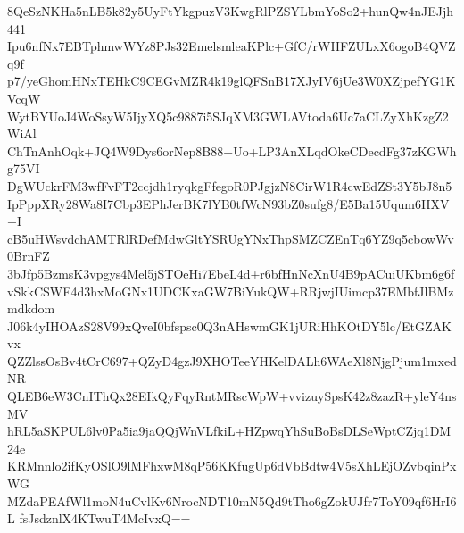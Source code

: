 8QeSzNKHa5nLB5k82y5UyFtYkgpuzV3KwgRlPZSYLbmYoSo2+hunQw4nJEJjh441
Ipu6nfNx7EBTphmwWYz8PJs32EmelsmleaKPlc+GfC/rWHFZULxX6ogoB4QVZq9f
p7/yeGhomHNxTEHkC9CEGvMZR4k19glQFSnB17XJyIV6jUe3W0XZjpefYG1KVcqW
WytBYUoJ4WoSsyW5IjyXQ5c9887i5SJqXM3GWLAVtoda6Uc7aCLZyXhKzgZ2WiAl
ChTnAnhOqk+JQ4W9Dys6orNep8B88+Uo+LP3AnXLqdOkeCDecdFg37zKGWhg75VI
DgWUckrFM3wfFvFT2ccjdh1ryqkgFfegoR0PJgjzN8CirW1R4cwEdZSt3Y5bJ8n5
IpPppXRy28Wa8I7Cbp3EPhJerBK7lYB0tfWcN93bZ0sufg8/E5Ba15Uqum6HXV+I
cB5uHWsvdchAMTRlRDefMdwGltYSRUgYNxThpSMZCZEnTq6YZ9q5cbowWv0BrnFZ
3bJfp5BzmsK3vpgys4Mel5jSTOeHi7EbeL4d+r6bfHnNcXnU4B9pACuiUKbm6g6f
vSkkCSWF4d3hxMoGNx1UDCKxaGW7BiYukQW+RRjwjIUimcp37EMbfJlBMzmdkdom
J06k4yIHOAzS28V99xQveI0bfspsc0Q3nAHswmGK1jURiHhKOtDY5lc/EtGZAKvx
QZZlssOsBv4tCrC697+QZyD4gzJ9XHOTeeYHKelDALh6WAeXl8NjgPjum1mxedNR
QLEB6eW3CnIThQx28EIkQyFqyRntMRscWpW+vvizuySpsK42z8zazR+yleY4nsMV
hRL5aSKPUL6lv0Pa5ia9jaQQjWnVLfkiL+HZpwqYhSuBoBsDLSeWptCZjq1DM24e
KRMnnlo2ifKyOSlO9lMFhxwM8qP56KKfugUp6dVbBdtw4V5sXhLEjOZvbqinPxWG
MZdaPEAfWl1moN4uCvlKv6NrocNDT10mN5Qd9tTho6gZokUJfr7ToY09qf6HrI6L
fsJsdznlX4KTwuT4McIvxQ==
